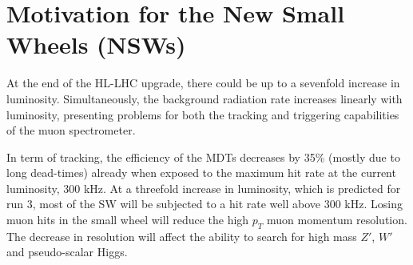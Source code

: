 



\section{Motivation for the New Small Wheels (NSWs)}

At the end of the HL-LHC upgrade, there could be up to a sevenfold increase in luminosity. Simultaneously, the background radiation rate increases linearly with luminosity, presenting problems for both the tracking and triggering capabilities of the muon spectrometer.

In term of tracking, the efficiency of the MDTs decreases by 35\% (mostly due to long dead-times) already when exposed to the maximum hit rate at the current luminosity, 300 kHz.
At a threefold increase in luminosity, which is predicted for run 3, most of the SW will be subjected to a hit rate well above 300 kHz. Losing muon hits in the small wheel will reduce the high $p_T$ muon momentum resolution. The decrease in resolution will affect the ability to search for high mass $Z'$, $W'$ and pseudo-scalar Higgs.

